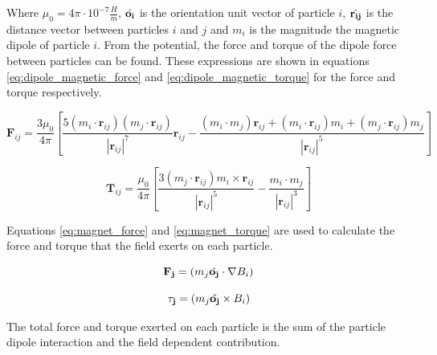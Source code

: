Where $\mu_0 = 4\pi \cdot 10^{-7} \frac{H}{m}$,  $\Hat{\mathbf{o_i}}$ is the orientation unit vector of particle 
$i$, $\Hat{\mathbf{r_{ij}}}$ is the distance vector between particles $i$ and $j$ and $m_i$ is the magnitude the 
magnetic dipole of particle $i$. From the potential, the force and torque of the dipole force between particles 
can be found. These expressions are shown in equations \ref{eq:dipole_magnetic_force} and \ref{eq:dipole_magnetic_torque} 
for the force and torque respectively.

\begin{equation}
    \mathbf{F}_{ij} = \frac{3 \mu_0}{4 \pi} [\frac{5(m_i \cdot \mathbf{r}_{ij})(m_j 
    \cdot \mathbf{r}_{ij})}{|\mathbf{r}_{ij}|^7}\mathbf{r}_{ij} - \frac{(m_i \cdot m_{j})\mathbf{r}_{ij} + 
    (m_i \cdot \mathbf{r}_{ij})m_i + (m_j \cdot \mathbf{r}_{ij})m_j }{|\mathbf{r}_{ij}|^5}]
\label{eq:dipole_magnetic_force}
\end{equation}

\begin{equation}
    \mathbf{T}_{ij} = \frac{\mu_0}{4 \pi}[ \frac{3(m_j \cdot \mathbf{r}_{ij})m_i \times \mathbf{r}_{ij} }
    {|\mathbf{r}_{ij}|^5} - \frac{m_i \cdot m_j }{|\mathbf{r}_{ij}|^3} ]
    \label{eq:dipole_magnetic_torque}
\end{equation}

Equations \ref{eq:magnet_force} and \ref{eq:magnet_torque} are used to calculate the force and torque that the 
field exerts on each particle.

\begin{equation}
    \mathbf{F_{j}} = (m_j \Hat{\mathbf{o_j}} \cdot \nabla B_i)
    \label{eq:magnet_force}
\end{equation}

\begin{equation}
    \mathbf{\tau_j} = (m_j \Hat{\mathbf{o_j}} \times B_i)
    \label{eq:magnet_torque}
\end{equation}

The total force and torque exerted on each particle is the sum of the particle dipole interaction and the field 
dependent contribution. 
